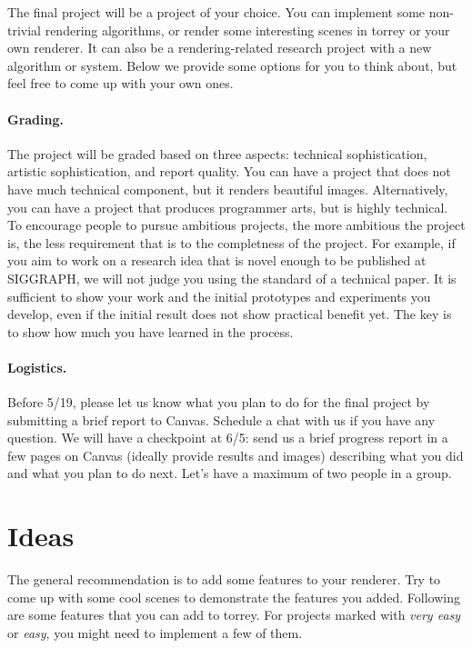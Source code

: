 




The final project will be a project of your choice. You can implement some non-trivial rendering algorithms, or render some interesting scenes in torrey or your own renderer. It can also be a rendering-related research project with a new algorithm or system. 
Below we provide some options for you to think about, but feel free to come up with your own ones.

\paragraph{Grading.} 
The project will be graded based on three aspects: technical sophistication, artistic sophistication, and report quality.
You can have a project that does not have much technical component, but it renders beautiful images.
Alternatively, you can have a project that produces programmer arts, but is highly technical. 
To encourage people to pursue ambitious projects, the more ambitious the project is, the less requirement that is to the completness of the project. 
For example, if you aim to work on a research idea that is novel enough to be published at SIGGRAPH, we will not judge you using the standard of a technical paper.
It is sufficient to show your work and the initial prototypes and experiments you develop, even if the initial result does not show practical benefit yet.
The key is to show how much you have learned in the process.

\paragraph{Logistics.}
Before 5/19, please let us know what you plan to do for the final project by submitting a brief report to Canvas.
Schedule a chat with us if you have any question. 
We will have a checkpoint at 6/5: send us a brief progress report in a few pages on Canvas (ideally provide results and images) describing what you did and what you plan to do next.
Let's have a maximum of two people in a group. 

\section{Ideas}

The general recommendation is to add some features to your renderer. Try to come up with some cool scenes to demonstrate the features you added. Following are some features that you can add to torrey. For projects marked with \emph{very easy} or \emph{easy}, you might need to implement a few of them.

